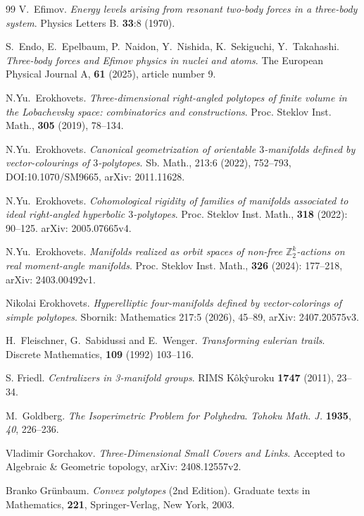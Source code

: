 \documentclass[12pt]{amsart}
\theoremstyle{definition}
\theoremstyle{remark}
\begin{document}
\begin{thebibliography}{99}
V.~Efimov. 
\emph{Energy levels arising from resonant two-body forces in a three-body system}.
Physics Letters B. {\bf 33}:8 (1970). 

S.~Endo, E.~Epelbaum, P.~Naidon, Y.~Nishida, K.~Sekiguchi, Y.~Takahashi.
\emph{Three-body forces and Efimov physics in nuclei and atoms}.
The European Physical Journal A, {\bf 61} (2025), article number 9.

N.Yu.~Erokhovets.
\emph{Three-dimensional right-angled polytopes of finite volume in the Lobachevsky space: combinatorics and constructions}.
Proc. Steklov Inst. Math., {\bf 305} (2019), 78--134. 

N.Yu.~Erokhovets.
\emph{Canonical geometrization of orientable $3$-manifolds defined by vector-colourings of $3$-polytopes}.
Sb. Math., 213:6 (2022), 752--793, DOI:10.1070/SM9665, arXiv: 2011.11628.

N.Yu.~Erokhovets.
\emph{Cohomological rigidity of families of manifolds associated to ideal right-angled hyperbolic $3$-polytopes}.
Proc. Steklov Inst. Math., {\bf 318} (2022): 90--125. arXiv: 2005.07665v4.

N.Yu.~Erokhovets.
\emph{Manifolds realized as orbit spaces of non-free  $\mathbb Z_2^k$-actions on real moment-angle manifolds}. 
Proc. Steklov Inst. Math., {\bf 326} (2024): 177--218, arXiv: 2403.00492v1.

Nikolai Erokhovets.
\emph{Hyperelliptic four-manifolds defined by vector-colorings of simple polytopes}.
Sbornik: Mathematics 217:5 (2026), 45--89, arXiv: 2407.20575v3.

H.~Fleischner, G.~Sabidussi and E.~Wenger.
\emph{Transforming eulerian trails}.
Discrete Mathematics, {\bf 109} (1992) 103--116.

S. Friedl.
\emph{Centralizers in 3-manifold groups}.
RIMS K\^{o}k\^{y}uroku {\bf 1747} (2011), 23--34.

M.~Goldberg. 
\emph{The Isoperimetric Problem for Polyhedra}. 
{\em Tohoku Math. J.} {\bf 1935}, {\em 40}, 226--236.

Vladimir Gorchakov.
\emph{Three-Dimensional Small Covers and Links}.
Accepted to Algebraic \& Geometric topology, arXiv: 2408.12557v2.

Branko Gr\"{u}nbaum. 
\emph{Convex polytopes} (2nd Edition). 
Graduate texts in Mathematics, {\bf 221}, Springer-Verlag, New York, 2003.


\end{thebibliography}
\end{document}
